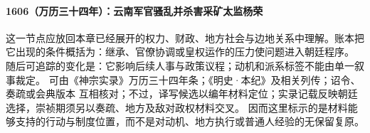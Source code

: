 \paragraph{1606（万历三十四年）：云南军官骚乱并杀害采矿太监杨荣} 这一节点应放回本章已经展开的权力、财政、地方社会与边地关系中理解。账本把它出现的条件概括为：继承、官僚协调或皇权运作的压力使问题进入朝廷程序。 随后可追踪的变化是：它影响后续人事与政策议程；动机和派系标签不能由单一叙事裁定。 可由《神宗实录》万历三十四年条；《明史·本纪》及相关列传；诏令、奏疏或会典版本 互相核对；不过，译写候选以编年材料定位；实录记载反映朝廷选择，崇祯期须另以奏疏、地方及敌对政权材料交叉。 因而这里标示的是材料能够支持的行动与制度位置，而不是对动机、地方执行或普通人经验的无保留复原。
